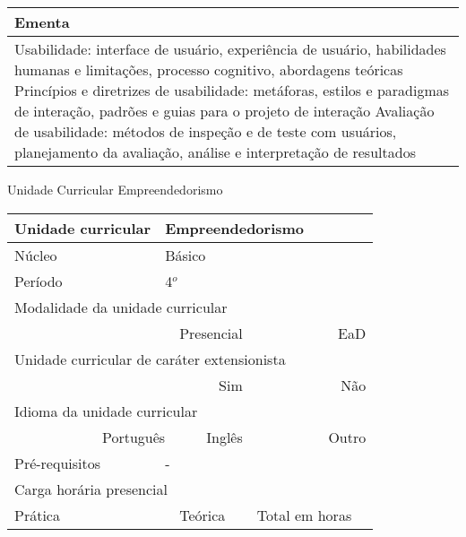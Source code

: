 \begin{quadro}[ht!]
\begin{tabular}{|p{3cm} p{2cm} p{3cm} p{2cm} p{3cm} p{2cm}|}
\multicolumn{6}{|p{15cm}|}{\cellcolor{blue1} Ementa} \\\hline
\hline\multicolumn{6}{|p{15cm}|}{\scriptsize Usabilidade: interface de usuário, experiência de usuário, habilidades humanas e limitações, processo cognitivo, abordagens teóricas Princípios e diretrizes de usabilidade: metáforas, estilos e paradigmas de interação, padrões e guias para o projeto de interação Avaliação de usabilidade: métodos de inspeção e de teste com usuários, planejamento da avaliação, análise e interpretação de resultados}\\\hline
\hline
	\end{tabular}
\end{quadro}
\begin{quadro}[ht!]
  \centering\scriptsize
\caption{Unidade Curricular Empreendedorismo}
\label{ unit_22 }
\begin{tabular}{|p{3cm} p{2cm} p{3cm} p{2cm} p{3cm} p{2cm}|}\hline
\multicolumn{1}{|p{3cm}|}{\cellcolor{blue1} Unidade curricular} & \multicolumn{5}{p{9cm}|}{ Empreendedorismo }\\\hline
\multicolumn{1}{|p{3cm}|}{\cellcolor{blue1} Núcleo} & \multicolumn{5}{p{11.5cm}|}{ Básico }\\\hline
\multicolumn{1}{|p{3cm}|}{\cellcolor{blue1} Período} & \multicolumn{5}{p{9cm}|}{ 4$^o$ }\\\hline
\multicolumn{6}{|p{15cm}|}{\cellcolor{blue1} Modalidade da unidade curricular} \\\hline
\multicolumn{2}{|r}{		} &  \multicolumn{2}{r}{Presencial \XBox } & \multicolumn{2}{r|}{EaD \Square	} \\\hline
\multicolumn{6}{|p{15cm}|}{\cellcolor{blue1} Unidade curricular de caráter extensionista} \\\hline
\multicolumn{4}{|r}{			Sim \Square	} & \multicolumn{2}{r|}{	Não \XBox	}\\\hline
\multicolumn{6}{|p{15cm}|}{\cellcolor{blue1} Idioma da unidade curricular} \\ \hline
\multicolumn{2}{|r}{	Português \XBox	} &  \multicolumn{2}{r}{	Inglês \Square	} & \multicolumn{2}{r|}{	Outro \Square	} \\ \hline
\multicolumn{1}{|p{3cm}|}{\cellcolor{blue1} Pré-requisitos} & \multicolumn{5}{p{9cm}|}{ - }\\ \hline
\multicolumn{6}{|p{15cm}|}{\cellcolor{blue1} Carga horária presencial} \\ \hline
\multicolumn{1}{|p{3cm}|}{\raggedleft Prática} & \multicolumn{1}{p{1cm}|}{\centering	15	} &  \multicolumn{1}{p{3cm}|}{\raggedleft Teórica}  & \multicolumn{1}{p{1cm}|}{\centering 	15 } & \multicolumn{1}{p{3cm}|}{\raggedleft Total em horas} & \multicolumn{1}{p{1cm}|}{\raggedleft	30	} \\ \hline

\end{tabular}
\end{quadro}
